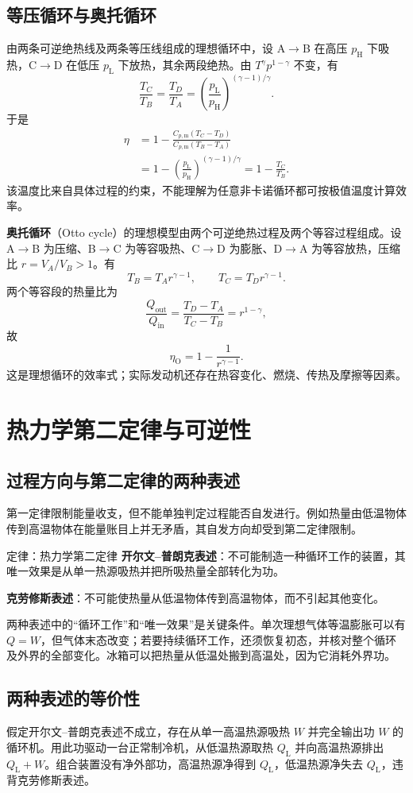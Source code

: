 \documentclass[UTF8,fontset=none,zihao=-4,a4paper]{ctexart}
\newcommand{\chapterpage}[1]{\clearpage\section{#1}}
\newcommand{\term}[1]{\textbf{#1}}
\begin{document}
\subsection{等压循环与奥托循环}
由两条可逆绝热线及两条等压线组成的理想循环中，设 A$\to$B 在高压 $p_{\mathrm H}$ 下吸热，C$\to$D 在低压 $p_{\mathrm L}$ 下放热，其余两段绝热。由 $T^\gamma p^{1-\gamma}$ 不变，有
\[
 \frac{T_C}{T_B}=\frac{T_D}{T_A}
 =\left(\frac{p_{\mathrm L}}{p_{\mathrm H}}\right)^{(\gamma-1)/\gamma}.
\]
于是
\begin{align*}
 \eta&=1-\frac{C_{p,\mathrm m}(T_C-T_D)}
 {C_{p,\mathrm m}(T_B-T_A)}\\
 &=1-\left(\frac{p_{\mathrm L}}{p_{\mathrm H}}\right)^{(\gamma-1)/\gamma}
 =1-\frac{T_C}{T_B}.
\end{align*}
该温度比来自具体过程的约束，不能理解为任意非卡诺循环都可按极值温度计算效率。

\term{奥托循环}（Otto cycle）的理想模型由两个可逆绝热过程及两个等容过程组成。设 A$\to$B 为压缩、B$\to$C 为等容吸热、C$\to$D 为膨胀、D$\to$A 为等容放热，压缩比 $r=V_A/V_B>1$。有
\[
 T_B=T_Ar^{\gamma-1},\qquad T_C=T_Dr^{\gamma-1}.
\]
两个等容段的热量比为
\[
 \frac{Q_{\mathrm{out}}}{Q_{\mathrm{in}}}
 =\frac{T_D-T_A}{T_C-T_B}=r^{1-\gamma},
\]
故
\[
 \eta_{\mathrm O}=1-\frac1{r^{\gamma-1}}.
\]
这是理想循环的效率式；实际发动机还存在热容变化、燃烧、传热及摩擦等因素。

\chapterpage{热力学第二定律与可逆性}
\subsection{过程方向与第二定律的两种表述}
第一定律限制能量收支，但不能单独判定过程能否自发进行。例如热量由低温物体传到高温物体在能量账目上并无矛盾，其自发方向却受到第二定律限制。
\begin{infobox}{定律：热力学第二定律}
\term{开尔文--普朗克表述}：不可能制造一种循环工作的装置，其唯一效果是从单一热源吸热并把所吸热量全部转化为功。

\term{克劳修斯表述}：不可能使热量从低温物体传到高温物体，而不引起其他变化。
\end{infobox}
两种表述中的“循环工作”和“唯一效果”是关键条件。单次理想气体等温膨胀可以有 $Q=W$，但气体末态改变；若要持续循环工作，还须恢复初态，并核对整个循环及外界的全部变化。冰箱可以把热量从低温处搬到高温处，因为它消耗外界功。

\subsection{两种表述的等价性}
假定开尔文--普朗克表述不成立，存在从单一高温热源吸热 $W$ 并完全输出功 $W$ 的循环机。用此功驱动一台正常制冷机，从低温热源取热 $Q_{\mathrm L}$ 并向高温热源排出 $Q_{\mathrm L}+W$。组合装置没有净外部功，高温热源净得到 $Q_{\mathrm L}$，低温热源净失去 $Q_{\mathrm L}$，违背克劳修斯表述。
\end{document}

